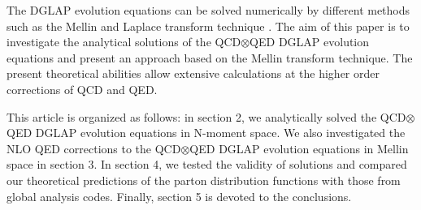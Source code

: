 \documentclass[review]{elsarticle}
\begin{document}
The DGLAP evolution equations can be solved
numerically by different methods such as the Mellin and Laplace transform technique \cite{Moch:2004pa,Vogt:2004ns,Block:2007pg,Block:2010du,Mottaghizadeh:2016krr,TaghaviShahri:2010be,AtashbarTehrani:2013qea,Zarei:2015jvh,Zarrin:2016kxf}.
The aim of this paper is to investigate the analytical solutions of
the QCD$\otimes$QED DGLAP evolution equations and present an approach
based on the Mellin transform technique. The present theoretical abilities allow
extensive calculations at the higher order corrections of QCD and
QED.

This article is organized as follows: in section 2,
we analytically solved the QCD$\otimes$QED DGLAP evolution equations
in N-moment space. We also investigated the NLO QED corrections to the QCD$\otimes$QED DGLAP evolution equations in Mellin space in section 3. In section 4, we tested the validity  of solutions and compared our theoretical predictions of the parton distribution functions with those from global analysis codes. Finally,
section 5 is devoted to the conclusions.
\end{document}

